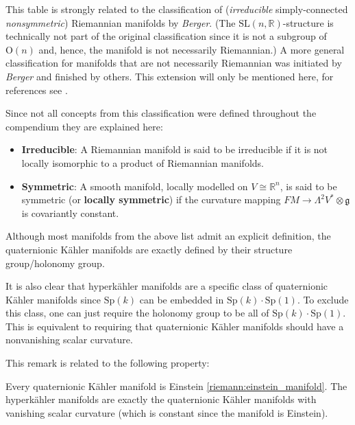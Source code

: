     \begin{remark*}
        This table is strongly related to the classification of (\textit{irreducible} simply-connected \textit{nonsymmetric}) Riemannian manifolds by \textit{Berger}. (The $\mathrm{SL}(n,\mathbb{R})$-structure is technically not part of the original classification since it is not a subgroup of $\mathrm{O}(n)$ and, hence, the manifold is not necessarily Riemannian.) A more general classification for manifolds that are not necessarily Riemannian was initiated by \textit{Berger} and finished by others. This extension will only be mentioned here, for references see \cite{diffgeom_physics}.

        Since not all concepts from this classification were defined throughout the compendium they are explained here:
        \begin{itemize}
            \item\textbf{Irreducible}: A Riemannian manifold is said to be irreducible if it is not locally isomorphic to a product of Riemannian manifolds.
            \item\textbf{Symmetric}: A smooth manifold, locally modelled on $V\cong\mathbb{R}^n$, is said to be symmetric (or \textbf{locally symmetric}) if the curvature mapping $FM\rightarrow\Lambda^2V^*\otimes\mathfrak{g}$ is covariantly constant.
        \end{itemize}
    \end{remark*}

    \begin{remark}
        Although most manifolds from the above list admit an explicit definition, the quaternionic K\"ahler manifolds are exactly defined by their structure group/holonomy group.

        It is also clear that hyperk\"ahler manifolds are a specific class of quaternionic K\"ahler manifolds since $\mathrm{Sp}(k)$ can be embedded in $\mathrm{Sp}(k)\cdot\mathrm{Sp}(1)$. To exclude this class, one can just require the holonomy group to be all of $\mathrm{Sp}(k)\cdot\mathrm{Sp}(1)$. This is equivalent to requiring that quaternionic K\"ahler manifolds should have a nonvanishing scalar curvature.
    \end{remark}
    This remark is related to the following property:
    \begin{property}
        Every quaternionic K\"ahler manifold is Einstein \ref{riemann:einstein_manifold}. The hyperk\"ahler manifolds are exactly the quaternionic K\"ahler manifolds with vanishing scalar curvature (which is constant since the manifold is Einstein).
    \end{property}